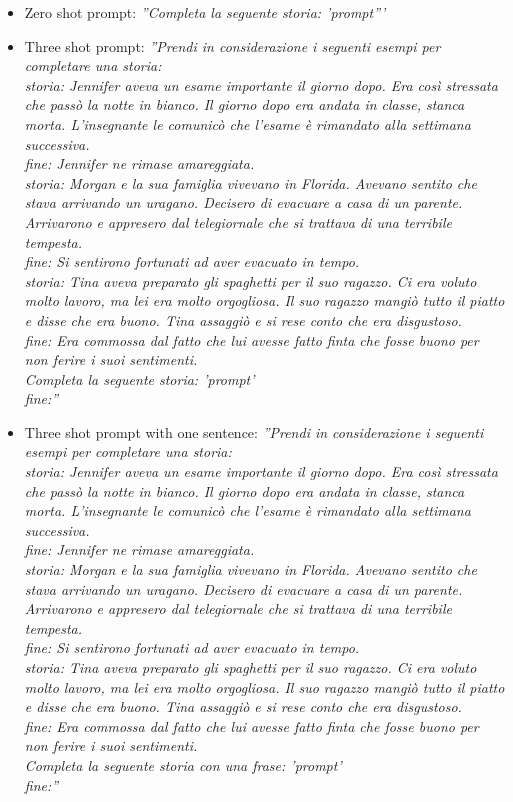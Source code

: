 \begin{itemize}
    \item Zero shot prompt: \emph{''Completa la seguente storia: '{prompt}'''}
    \item Three shot prompt: \emph{''Prendi in considerazione i seguenti esempi per completare una storia:\\
                storia: Jennifer aveva un esame importante il giorno dopo.	Era così stressata che passò la notte in bianco.	Il giorno dopo era andata in classe, stanca morta.	L'insegnante le comunicò che l'esame è rimandato alla settimana successiva.\\
                fine: Jennifer ne rimase amareggiata.\\
                storia: Morgan e la sua famiglia vivevano in Florida.	Avevano sentito che stava arrivando un uragano.	Decisero di evacuare a casa di un parente.	Arrivarono e appresero dal telegiornale che si trattava di una terribile tempesta.\\
                fine: Si sentirono fortunati ad aver evacuato in tempo.\\
                storia: Tina aveva preparato gli spaghetti per il suo ragazzo.	Ci era voluto molto lavoro, ma lei era molto orgogliosa.	Il suo ragazzo mangiò tutto il piatto e disse che era buono.	Tina assaggiò e si rese conto che era disgustoso.\\
                fine: Era commossa dal fatto che lui avesse fatto finta che fosse buono per non ferire i suoi sentimenti.\\
                Completa la seguente storia: '{prompt}'\\
                fine:''}
    \item Three shot prompt with one sentence: \emph{''Prendi in considerazione i seguenti esempi per completare una storia:\\
                storia: Jennifer aveva un esame importante il giorno dopo.	Era così stressata che passò la notte in bianco.	Il giorno dopo era andata in classe, stanca morta.	L'insegnante le comunicò che l'esame è rimandato alla settimana successiva.\\
                fine: Jennifer ne rimase amareggiata.\\
                storia: Morgan e la sua famiglia vivevano in Florida.	Avevano sentito che stava arrivando un uragano.	Decisero di evacuare a casa di un parente.	Arrivarono e appresero dal telegiornale che si trattava di una terribile tempesta.\\
                fine: Si sentirono fortunati ad aver evacuato in tempo.\\
                storia: Tina aveva preparato gli spaghetti per il suo ragazzo.	Ci era voluto molto lavoro, ma lei era molto orgogliosa.	Il suo ragazzo mangiò tutto il piatto e disse che era buono.	Tina assaggiò e si rese conto che era disgustoso.\\
                fine: Era commossa dal fatto che lui avesse fatto finta che fosse buono per non ferire i suoi sentimenti.\\
                Completa la seguente storia con una frase: '{prompt}'\\
                fine:''}
\end{itemize}
